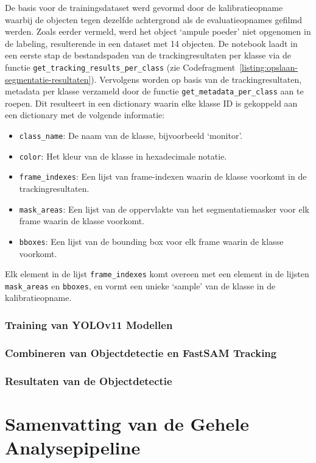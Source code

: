 De basis voor de trainingsdataset werd gevormd door de kalibratieopname waarbij de objecten 
tegen dezelfde achtergrond als de evaluatieopnames gefilmd werden.
Zoals eerder vermeld, werd het object `ampule poeder' niet opgenomen in de labeling, resulterende in een dataset met 14 objecten.
De notebook laadt in een eerste stap de bestandspaden van de trackingresultaten per klasse 
via de functie \texttt{get\_tracking\_results\_per\_class} (zie Codefragment~\ref{listing:opslaan-segmentatie-resultaten}).
Vervolgens worden op basis van de trackingresultaten, metadata per klasse verzameld door de functie \texttt{get\_metadata\_per\_class} aan te roepen.
Dit resulteert in een dictionary waarin elke klasse ID is gekoppeld aan een dictionary met de volgende informatie:
\begin{itemize}
    \item \texttt{class\_name}: De naam van de klasse, bijvoorbeeld `monitor'.
    \item \texttt{color}: Het kleur van de klasse in hexadecimale notatie.
    \item \texttt{frame_indexes}: Een lijst van frame-indexen waarin de klasse voorkomt in de trackingresultaten.
    \item \texttt{mask_areas}: Een lijst van de oppervlakte van het segmentatiemasker voor elk frame waarin de klasse voorkomt.
    \item \texttt{bboxes}: Een lijst van de bounding box voor elk frame waarin de klasse voorkomt.
\end{itemize}
Elk element in de lijst \texttt{frame\_indexes} komt overeen met een element in de lijsten 
\texttt{mask\_areas} en \texttt{bboxes}, en vormt een unieke `sample' van de klasse in de kalibratieopname.



\subsubsection{Training van YOLOv11 Modellen}

\subsubsection{Combineren van Objectdetectie en FastSAM Tracking}

\subsubsection{Resultaten van de Objectdetectie}

\section{Samenvatting van de Gehele Analysepipeline}